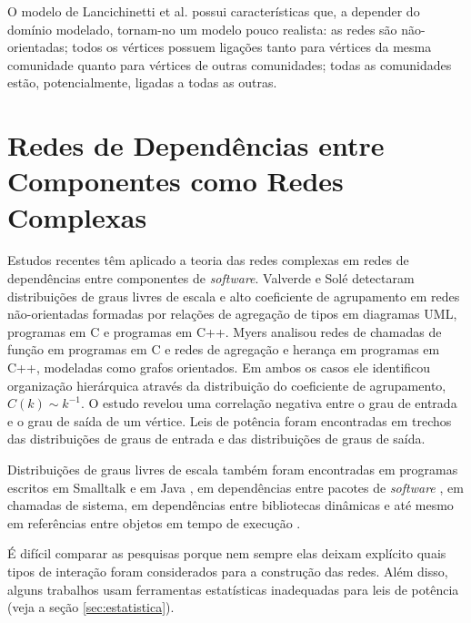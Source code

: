 \documentclass{article}
\begin{document}
O modelo de Lancichinetti et al. possui características que, a depender do domínio modelado, tornam-no um modelo pouco realista: as redes são não-orientadas; todos os vértices possuem ligações tanto para vértices da mesma comunidade quanto para vértices de outras comunidades; todas as comunidades estão, potencialmente, ligadas a todas as outras.

\section{Redes de Dependências entre Componentes como Redes Complexas}

Estudos recentes têm aplicado a teoria das redes complexas em redes de dependências entre componentes de \textit{software}. Valverde e Solé \cite{Valverde2003} detectaram distribuições de graus livres de escala e alto coeficiente de agrupamento em redes não-orientadas formadas por relações de agregação de tipos em diagramas UML, programas em C e programas em C++. Myers \cite{Myers2003} analisou redes de chamadas de função em programas em C e redes de agregação e herança em programas em C++, modeladas como grafos orientados. Em ambos os casos ele identificou organização hierárquica através da distribuição do coeficiente de agrupamento, $C(k) \sim k^{-1}$. O estudo revelou uma correlação negativa entre o grau de entrada e o grau de saída de um vértice. Leis de potência foram encontradas em trechos das distribuições de graus de entrada e das distribuições de graus de saída.

Distribuições de graus livres de escala também foram encontradas em programas escritos em Smalltalk \cite{Marchesi2004,Concas2007} e em Java \cite{Hyland-Wood2006,Baxter2006,Ichii2008}, em dependências entre pacotes de \textit{software} \cite{Labelle2004}, em chamadas de sistema, em dependências entre bibliotecas dinâmicas \cite{Louridas2008} e até mesmo em referências entre objetos em tempo de execução \cite{Potanin2005}.

É difícil comparar as pesquisas porque nem sempre elas deixam explícito quais tipos de interação foram considerados para a construção das redes. Além disso, alguns trabalhos usam ferramentas estatísticas inadequadas para leis de potência (veja a seção \ref{sec:estatistica}).

\end{document}
